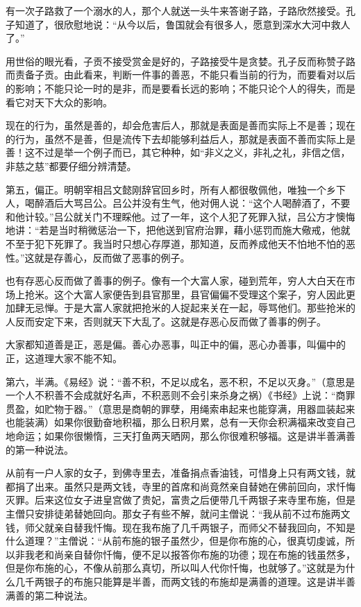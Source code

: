 \documentclass[12pt,UTF8]{ctexbook}
\begin{document}
有一次子路救了一个溺水的人，那个人就送一头牛来答谢子路，子路欣然接受。孔子知道了，很欣慰地说：“从今以后，鲁国就会有很多人，愿意到深水大河中救人了。”

用世俗的眼光看，子贡不接受赏金是好的，子路接受牛是贪婪。孔子反而称赞子路而责备子贡。由此看来，判断一件事的善恶，不能只看当前的行为，而要看对以后的影响；不能只论一时的是非，而是要看长远的影响；不能只论个人的得失，而是看它对天下大众的影响。

现在的行为，虽然是善的，却会危害后人，那就是表面是善而实际上不是善；现在的行为，虽然不是善，但是流传下去却能够利益后人，那就是表面不善而实际上是善！这不过是举一个例子而已，其它种种，如“非义之义，非礼之礼，非信之信，非慈之慈”都要仔细分辨清楚。

第五，偏正。明朝宰相吕文懿刚辞官回乡时，所有人都很敬佩他，唯独一个乡下人，喝醉酒后大骂吕公。吕公并没有生气，他对佣人说：“这个人喝醉酒了，不要和他计较。”吕公就关门不理睬他。过了一年，这个人犯了死罪入狱，吕公方才懊悔地讲：“若是当时稍微惩治一下，把他送到官府治罪，藉小惩罚而施大儆戒，他就不至于犯下死罪了。我当时只想心存厚道，那知道，反而养成他天不怕地不怕的恶性。”这就是存善心，反而做了恶事的例子。

也有存恶心反而做了善事的例子。像有一个大富人家，碰到荒年，穷人大白天在市场上抢米。这个大富人家便告到县官那里，县官偏偏不受理这个案子，穷人因此更加肆无忌惮。于是大富人家就把抢米的人捉起来关在一起，辱骂他们。那些抢米的人反而安定下来，否则就天下大乱了。这就是存恶心反而做了善事的例子。

大家都知道善是正，恶是偏。善心办恶事，叫正中的偏，恶心办善事，叫偏中的正，这道理大家不能不知。

第六，半满。《易经》说：“善不积，不足以成名，恶不积，不足以灭身。”（意思是一个人不积善不会成就好名声，不积恶则不会引来杀身之祸）《书经》上说：“商罪贯盈，如贮物于器。”（意思是商朝的罪孽，用绳索串起来也能穿满，用器皿装起来也能装满）如果你很勤奋地积福，那么日积月累，总有一天你会积满福来改变自己地命运；如果你很懒惰，三天打鱼两天晒网，那么你很难积够福。这是讲半善满善的第一种说法。

从前有一户人家的女子，到佛寺里去，准备捐点香油钱，可惜身上只有两文钱，就都捐了出来。虽然只是两文钱，寺里的首席和尚竟然亲自替她在佛前回向，求忏悔灭罪。后来这位女子进皇宫做了贵妃，富贵之后便带几千两银子来寺里布施，但是主僧只安排徒弟替她回向。那女子有些不解，就问主僧说：“我从前不过布施两文钱，师父就亲自替我忏悔。现在我布施了几千两银子，而师父不替我回向，不知是什么道理？”主僧说：“从前布施的银子虽然少，但是你布施的心，很真切虔诚，所以非我老和尚亲自替你忏悔，便不足以报答你布施的功德；现在布施的钱虽然多，但是你布施的心，不像从前那么真切，所以叫人代你忏悔，也就够了。”这就是为什么几千两银子的布施只能算是半善，而两文钱的布施却是满善的道理。这是讲半善满善的第二种说法。
\end{document}
